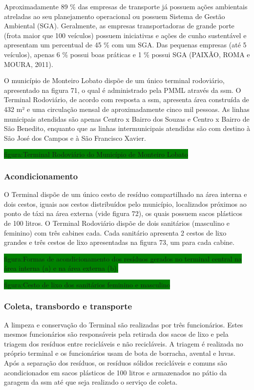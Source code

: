 	Aproximadamente 89 \% das empresas de transporte já possuem ações ambientais atreladas ao seu planejamento operacional ou possuem Sistema de Gestão Ambiental (SGA). Geralmente, as empresas transportadoras de grande porte (frota maior que 100 veículos) possuem iniciativas e ações de cunho sustentável e apresentam um percentual de 45 \% com um SGA. Das pequenas empresas (até 5 veículos), apenas 6 \% possui boas práticas e 1 \% possui SGA (PAIXÃO, ROMA e MOURA, 2011).
	
	O município de Monteiro Lobato dispõe de um único terminal rodoviário, apresentado na figura 71, o qual é administrado pela PMML através da \gls{ssm}. O Terminal Rodoviário, de acordo com resposta a \gls{ssm}, apresenta área construída de 432 m² e uma circulação mensal de aproximadamente cinco mil pessoas. As linhas municipais atendidas são apenas Centro x Bairro dos Souzas e Centro x Bairro de São Benedito, enquanto que as linhas intermunicipais atendidas são com destino à São José dos Campos e à São Francisco Xavier.
	
	\colorbox{green}{figura:Terminal Rodoviário do Município de Monteiro Lobato}
	
	\subsubsection{Acondicionamento}
	O Terminal dispõe de um único cesto de resíduo compartilhado na área interna e dois cestos, iguais aos cestos distribuídos pelo município, localizados próximos ao ponto de táxi na área externa (vide figura 72), os quais possuem sacos plásticos de 100 litros. O Terminal Rodoviário dispõe de dois sanitários (masculino e feminino) com três cabines cada. Cada sanitário apresenta 2 cestos de lixo grandes e três cestos de lixo apresentadas na figura 73, um para cada cabine.
	
	\colorbox{green}{figura:Formas de acondicionamento dos resíduos gerados no terminal central na área interna (a) e na área externa (b).}
	
	\colorbox{green}{figura:Cesto de lixo dos sanitários feminino e masculino}
	
	\subsubsection{Coleta, transbordo e transporte}
	A limpeza e conservação do Terminal são realizadas por três funcionários. Estes mesmos funcionários são responsáveis pela retirada dos sacos de lixo e pela triagem dos resíduos entre recicláveis e não recicláveis. A triagem é realizada no próprio terminal e os funcionários usam de bota de borracha, avental e luvas. Após a separação dos resíduos, os resíduos sólidos recicláveis e comuns são acondicionados em sacos plásticos de 100 litros e armazenados no pátio da garagem da \gls{ssm} até que seja realizado o serviço de coleta.
	
